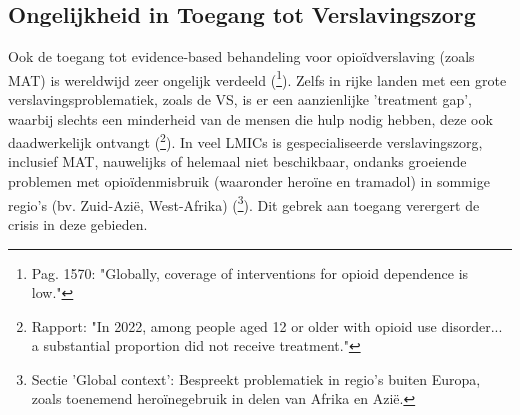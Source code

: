 \documentclass[11pt, a4paper]{report} %
\begin{document}
\subsection{Ongelijkheid in Toegang tot Verslavingszorg}
Ook de toegang tot evidence-based behandeling voor opioïdverslaving (zoals MAT) is wereldwijd zeer ongelijk verdeeld (\cite{Degenhardt2019GlobalPatterns}\footnote{Pag. 1570: "Globally, coverage of interventions for opioid dependence is low."}). Zelfs in rijke landen met een grote verslavingsproblematiek, zoals de VS, is er een aanzienlijke 'treatment gap', waarbij slechts een minderheid van de mensen die hulp nodig hebben, deze ook daadwerkelijk ontvangt (\cite{SAMHSA2022NSDUH}\footnote{Rapport: "In 2022, among people aged 12 or older with opioid use disorder... a substantial proportion did not receive treatment."}). In veel LMICs is gespecialiseerde verslavingszorg, inclusief MAT, nauwelijks of helemaal niet beschikbaar, ondanks groeiende problemen met opioïdenmisbruik (waaronder heroïne en tramadol) in sommige regio's (bv. Zuid-Azië, West-Afrika) (\cite{EUDAHeroinGlobal}\footnote{Sectie 'Global context': Bespreekt problematiek in regio's buiten Europa, zoals toenemend heroïnegebruik in delen van Afrika en Azië.}). Dit gebrek aan toegang verergert de crisis in deze gebieden.
\end{document}
